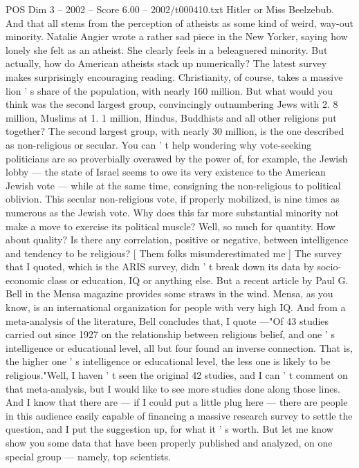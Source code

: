 \begin{textsample}{POS Dim 3 – 2002 – Score 6.00 – 2002/t000410.txt}
Hitler or Miss Beelzebub.
And that all stems from the perception of atheists as some kind of weird, way-out minority.
Natalie Angier wrote a rather sad piece in the New Yorker, saying how lonely she felt as an atheist.
She clearly feels in a beleaguered minority.
But actually, how do American atheists stack up numerically?
The latest survey makes surprisingly encouraging reading.
Christianity, of course, takes a massive lion ' s share of the population, with nearly 160 million.
But what would you think was the second largest group, convincingly outnumbering Jews with 2. 8 million, Muslims at 1. 1 million, Hindus, Buddhists and all other religions put together?
The second largest group, with nearly 30 million, is the one described as non-religious or secular.
You can ' t help wondering why vote-seeking politicians are so proverbially overawed by the power of, for example, the Jewish lobby — the state of Israel seems to owe its very existence to the American Jewish vote — while at the same time, consigning the non-religious to political oblivion.
This secular non-religious vote, if properly mobilized, is nine times as numerous as the Jewish vote.
Why does this far more substantial minority not make a move to exercise its political muscle?
Well, so much for quantity.
How about quality?
Is there any correlation, positive or negative, between intelligence and tendency to be religious? [ Them folks misunderestimated me ] The survey that I quoted, which is the ARIS survey, didn ' t break down its data by socio-economic class or education, IQ or anything else.
But a recent article by Paul G.
Bell in the Mensa magazine provides some straws in the wind.
Mensa, as you know, is an international organization for people with very high IQ.
And from a meta-analysis of the literature, Bell concludes that, I quote —"Of 43 studies carried out since 1927 on the relationship between religious belief, and one ' s intelligence or educational level, all but four found an inverse connection.
That is, the higher one ' s intelligence or educational level, the less one is likely to be religious."Well, I haven ' t seen the original 42 studies, and I can ' t comment on that meta-analysis, but I would like to see more studies done along those lines.
And I know that there are — if I could put a little plug here — there are people in this audience easily capable of financing a massive research survey to settle the question, and I put the suggestion up, for what it ' s worth.
But let me know show you some data that have been properly published and analyzed, on one special group — namely, top scientists.

\end{textsample}
